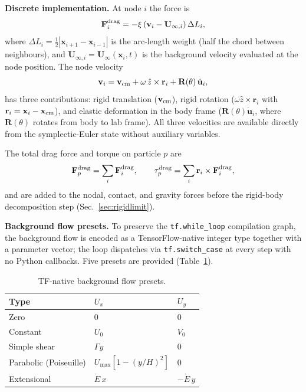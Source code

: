 \documentclass[aps,pre,twocolumn,floatfix,longbibliography]{revtex4-2}
\begin{document}
\textbf{Discrete implementation.}  At node $i$ the force is
\begin{equation}
  \mathbf{F}_i^{\rm drag} = -\xi\,(\mathbf{v}_i - \mathbf{U}_{\infty,i})\,\Delta L_i,
  \label{eq:drag_discrete}
\end{equation}
where $\Delta L_i = \tfrac{1}{2}|\mathbf{x}_{i+1}-\mathbf{x}_{i-1}|$ is the
arc-length weight (half the chord between neighbours), and
$\mathbf{U}_{\infty,i} = \mathbf{U}_{\infty}(\mathbf{x}_i, t)$ is the background
velocity evaluated at the node position.  The node velocity
\begin{equation}
  \mathbf{v}_i = \mathbf{v}_{\rm cm}
               + \omega\,\hat{z}\times\mathbf{r}_i
               + \mathbf{R}(\theta)\,\dot{\mathbf{u}}_i,
  \label{eq:node_velocity}
\end{equation}
has three contributions: rigid translation ($\mathbf{v}_{\rm cm}$), rigid rotation
($\omega\hat{z}\times\mathbf{r}_i$ with $\mathbf{r}_i = \mathbf{x}_i - \mathbf{x}_{\rm cm}$),
and elastic deformation in the body frame ($\mathbf{R}(\theta)\dot{\mathbf{u}}_i$,
where $\mathbf{R}(\theta)$ rotates from body to lab frame).  All three velocities are
available directly from the symplectic-Euler state without auxiliary variables.

The total drag force and torque on particle $p$ are
\begin{equation}
  \mathbf{F}^{\rm drag}_p = \sum_i \mathbf{F}_i^{\rm drag},
  \qquad
  \tau^{\rm drag}_p = \sum_i \mathbf{r}_i \times \mathbf{F}_i^{\rm drag},
  \label{eq:drag_total}
\end{equation}
and are added to the nodal, contact, and gravity forces before the
rigid-body decomposition step (Sec.~\ref{sec:rigidlimit}).

\textbf{Background flow presets.}  To preserve the \texttt{tf.while\_loop}
compilation graph, the background flow is encoded as a TensorFlow-native integer
type together with a parameter vector; the loop dispatches via \texttt{tf.switch\_case}
at every step with no Python callbacks.  Five presets are provided
(Table~\ref{tab:bg_flows}).

\begin{table}[htb]
\caption{TF-native background flow presets.}
\label{tab:bg_flows}
\begin{ruledtabular}
\begin{tabular}{lll}
  Type & $U_x$ & $U_y$ \\
\hline
  Zero       & $0$ & $0$ \\
  Constant   & $U_0$ & $V_0$ \\
  Simple shear & $\Gamma y$ & $0$ \\
  Parabolic (Poiseuille) & $U_{\max}[1-(y/H)^2]$ & $0$ \\
  Extensional & $\dot{E}\,x$ & $-\dot{E}\,y$ \\
\end{tabular}
\end{ruledtabular}
\end{table}
\end{document}
